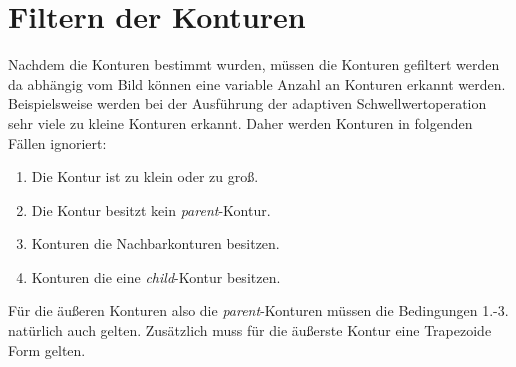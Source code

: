 \section{Filtern der Konturen}
Nachdem die Konturen bestimmt wurden, müssen die Konturen gefiltert werden da abhängig vom Bild können eine variable Anzahl an Konturen
erkannt werden. Beispielsweise werden bei der Ausführung der adaptiven Schwellwertoperation sehr viele zu kleine Konturen erkannt. Daher werden Konturen in folgenden Fällen ignoriert:
\begin{enumerate}
	\item Die Kontur ist zu klein oder zu groß.
	\item Die Kontur besitzt kein \emph{parent}-Kontur.
	\item Konturen die Nachbarkonturen besitzen.
	\item Konturen die eine \emph{child}-Kontur besitzen.
\end{enumerate}
Für die äußeren Konturen also die \emph{parent}-Konturen müssen die Bedingungen 1.-3. natürlich auch gelten. Zusätzlich muss für die äußerste Kontur eine Trapezoide Form gelten.


